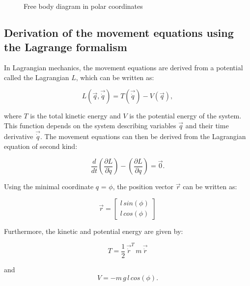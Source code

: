 \documentclass[12pt,bibstyle=none,pagenumberinfooter]{ifmdocument}
\begin{document}
\begin{figure}[h]

    \centering
    \def\svgwidth{0.4\textwidth}
    
    \caption{Free body diagram in polar coordinates}
    \label{fig:free body}
\end{figure}

\subsection{Derivation of the movement equations using the Lagrange formalism}
\label{sec: lagrange}

In Lagrangian mechanics, the movement equations are derived from a potential called the Lagrangian $L$, which can be written as:

\begin{equation}
    \label{eq: Lagrangian}
    L(\Vec{q}, \Vec{\Dot{q}}) = T(\Vec{\Dot{q}}) - V(\Vec{q}),
\end{equation}

where $T$ is the total kinetic energy and $V$ is the potential energy of the system. This function depends on the system describing variables $\Vec{q}$ and their time derivative $\Vec{\Dot{q}}$. The movement equations can then be derived from the Lagrangian equation of second kind:

\begin{equation}
    \label{eq: secondKindLagrangian}
    \frac{d}{dt}\left(\frac{\partial L}{\partial \Dot{q}}\right) - \left(\frac{\partial L}{\partial q}  \right) = \Vec{0}.
\end{equation}

Using the minimal coordinate $q$ = $\phi$, the position vector $\Vec{r}$ can be written as:

\begin{equation}
    \Vec{r} = \begin{bmatrix}
        l\,sin(\phi) \\ l\, cos(\phi)
    \end{bmatrix}
\end{equation}

Furthermore, the kinetic and potential energy are given by:

\begin{equation}
    T = \frac{1}{2}\,\Vec{\Dot{r}}^T\,m\,\Vec{\Dot{r}}
\end{equation}

and
\begin{equation}
    V = -m\,g\,l\,cos(\phi).
\end{equation}
\end{document}
